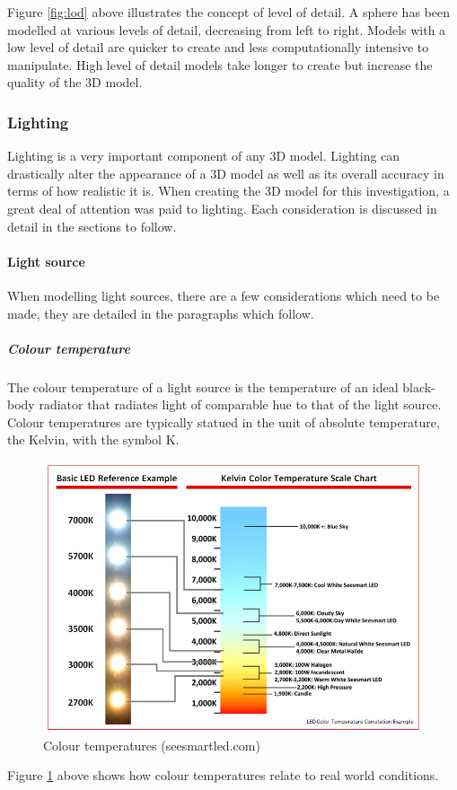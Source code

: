 \documentclass[11pt,a4paper]{report}
\begin{document}
			Figure \ref{fig:lod} above illustrates the concept of level of detail. A sphere has been modelled at various levels of detail, decreasing from left to right. Models with a low level of detail are quicker to create and less computationally intensive to manipulate. High level of detail models take longer to create but increase the quality of the 3D model.
				
			\subsubsection{Lighting}
				Lighting is a very important component of any 3D model. Lighting can drastically alter the appearance of a 3D model as well as its overall accuracy in terms of how realistic it is. When creating the 3D model for this investigation, a great deal of attention was paid to lighting. Each consideration is discussed in detail in the sections to follow.
				
				\paragraph{Light source}
					When modelling light sources, there are a few considerations which need to be made, they are detailed in the paragraphs which follow.
					
					\subparagraph{Colour temperature}
						The colour temperature of a light source is the temperature of an ideal black-body radiator that radiates light of comparable hue to that of the light source. Colour temperatures are typically statued in the unit of absolute temperature, the Kelvin, with the symbol K.
						\begin{figure}[H]
							\centering
							\includegraphics[width=1\textwidth]{colour_temperature}
							\caption[Colour temperatures]{Colour temperatures (seesmartled.com)}
							\label{fig:colour_temp}
						\end{figure}
						Figure \ref{fig:colour_temp} above shows how colour temperatures relate to real world conditions.
				
\end{document}
